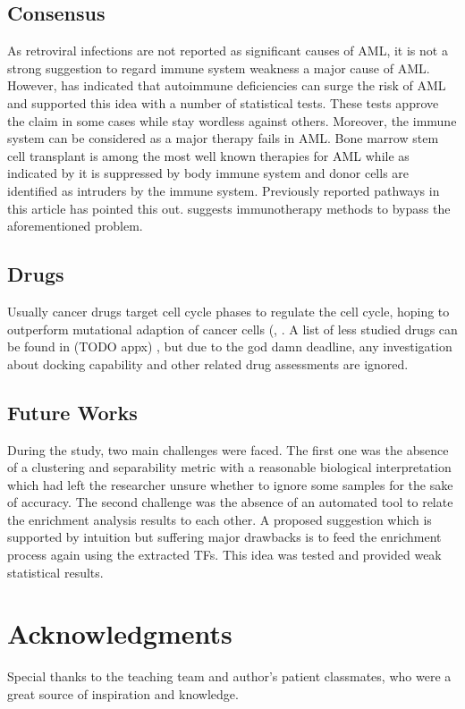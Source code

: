 \documentclass[3p,authoryear,preprint,12pt]{elsarticle}
\begin{document}
\subsection{Consensus}
As retroviral infections are not reported as significant causes of AML, it is not a strong suggestion to regard immune system weakness a major cause of AML. However, \cite{Ramadan2012} has indicated that autoimmune deficiencies can surge the risk of AML and supported this idea with a number of statistical tests. These tests approve the claim in some cases while stay wordless against others. Moreover, the immune system can be considered as a major therapy fails in AML. Bone marrow stem cell transplant is among the most well known therapies for AML while as indicated by \cite{Horowitz555} it is suppressed by body immune system and donor cells are identified as intruders by the immune system. Previously reported pathways in this article has pointed this out. \cite{Lamble2018} suggests immunotherapy methods to bypass the aforementioned problem.

\subsection{Drugs}
Usually cancer drugs target cell cycle phases to regulate the cell cycle, hoping to outperform mutational adaption of cancer cells (\cite{Shapiro1999}, \cite{Bai2017}. A list of less studied drugs can be found in (TODO appx)
, but due to the god damn deadline, any investigation about docking capability and other related drug assessments are ignored.

\subsection{Future Works}
During the study, two main challenges were faced. The first one was the absence of a clustering and separability metric with a reasonable biological interpretation which had left the researcher unsure whether to ignore some samples for the sake of accuracy. The second challenge was the absence of an automated tool to relate the enrichment analysis results to each other. A proposed suggestion which is supported by intuition but suffering major drawbacks is to feed the enrichment process again using the extracted TFs. This idea was tested and provided weak statistical results.

\section*{Acknowledgments} Special thanks to the teaching team and author's patient classmates, who were a great source of inspiration and knowledge.
\end{document}
